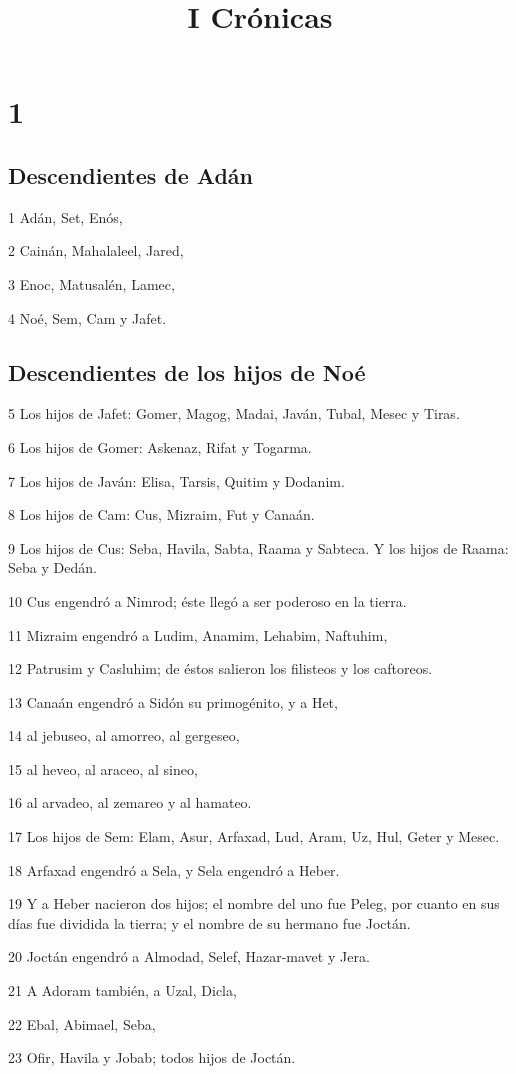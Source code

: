 

\title{I Crónicas}

\chapter{1}

\section*{Descendientes de Adán}

\par 1 Adán, Set, Enós,
\par 2 Cainán, Mahalaleel, Jared,
\par 3 Enoc, Matusalén, Lamec,
\par 4 Noé, Sem, Cam y Jafet.

\section*{Descendientes de los hijos de Noé}

\par 5 Los hijos de Jafet: Gomer, Magog, Madai, Javán, Tubal, Mesec y Tiras.
\par 6 Los hijos de Gomer: Askenaz, Rifat y Togarma.
\par 7 Los hijos de Javán: Elisa, Tarsis, Quitim y Dodanim.
\par 8 Los hijos de Cam: Cus, Mizraim, Fut y Canaán.
\par 9 Los hijos de Cus: Seba, Havila, Sabta, Raama y Sabteca. Y los hijos de Raama: Seba y Dedán.
\par 10 Cus engendró a Nimrod; éste llegó a ser poderoso en la tierra.
\par 11 Mizraim engendró a Ludim, Anamim, Lehabim, Naftuhim,
\par 12 Patrusim y Casluhim; de éstos salieron los filisteos y los caftoreos.
\par 13 Canaán engendró a Sidón su primogénito, y a Het,
\par 14 al jebuseo, al amorreo, al gergeseo,
\par 15 al heveo, al araceo, al sineo,
\par 16 al arvadeo, al zemareo y al hamateo.
\par 17 Los hijos de Sem: Elam, Asur, Arfaxad, Lud, Aram, Uz, Hul, Geter y Mesec.
\par 18 Arfaxad engendró a Sela, y Sela engendró a Heber.
\par 19 Y a Heber nacieron dos hijos; el nombre del uno fue Peleg, por cuanto en sus días fue dividida la tierra; y el nombre de su hermano fue Joctán.
\par 20 Joctán engendró a Almodad, Selef, Hazar-mavet y Jera.
\par 21 A Adoram también, a Uzal, Dicla,
\par 22 Ebal, Abimael, Seba,
\par 23 Ofir, Havila y Jobab; todos hijos de Joctán.


